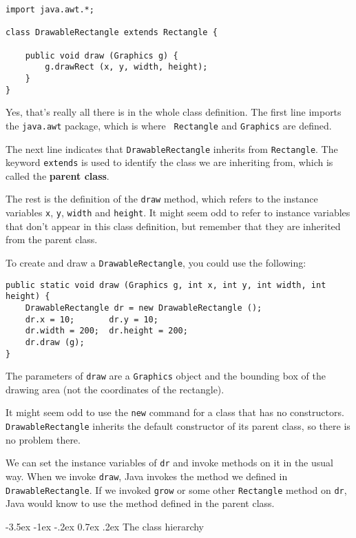 \documentclass{book}
\makeatletter
\renewcommand{\section}{\@startsection 
    {section} {1} {0mm}%
    {-3.5ex \@plus -1ex \@minus -.2ex}%
    {0.7ex \@plus.2ex}%
    {\normalfont\Large\bfseries}}
\makeatother
\begin{document}
\begin{verbatim}
import java.awt.*;

class DrawableRectangle extends Rectangle {

    public void draw (Graphics g) {
        g.drawRect (x, y, width, height);
    }
}
\end{verbatim}

Yes, that's really all there is in the whole class definition.  The
first line imports the {\tt java.awt} package, which is where {\tt
Rectangle} and {\tt Graphics} are defined.


The next line indicates that {\tt DrawableRectangle} inherits from
{\tt Rectangle}.  The keyword {\tt extends} is used to identify the
class we are inheriting from, which is called the {\bf parent class}.

The rest is the definition of the {\tt draw} method, which refers to
the instance variables {\tt x}, {\tt y}, {\tt width} and {\tt height}.
It might seem odd to refer to instance variables that don't appear in
this class definition, but remember that they are inherited from the
parent class.

To create and draw a {\tt DrawableRectangle}, you could use
the following:

\begin{verbatim}
public static void draw (Graphics g, int x, int y, int width, int height) {
    DrawableRectangle dr = new DrawableRectangle ();
    dr.x = 10;       dr.y = 10;
    dr.width = 200;  dr.height = 200;
    dr.draw (g);
}
\end{verbatim}

The parameters of {\tt draw} are a {\tt Graphics} object and
the bounding box of the drawing area (not the coordinates of the
rectangle).

It might seem odd to use the {\tt new} command for a class
that has no constructors.  {\tt DrawableRectangle}
inherits the default constructor of its parent class, so there
is no problem there.


We can set the instance variables of {\tt dr} and invoke methods
on it in the usual way.  When we invoke {\tt draw}, Java invokes
the method we defined in {\tt DrawableRectangle}.  If we invoked
{\tt grow} or some other {\tt Rectangle} method on {\tt dr}, Java
would know to use the method defined in the parent class.


\section{The class hierarchy}
\end{document}
